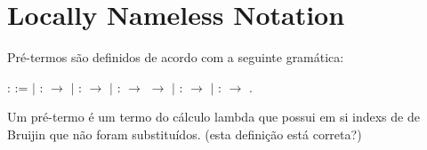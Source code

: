 
\begin{coqdoccode}
\coqdocemptyline
\end{coqdoccode}
\section{Locally Nameless Notation}



 Pré-termos são definidos de acordo com a seguinte gramática: \begin{coqdoccode}
\coqdocemptyline
\coqdocnoindent
{}  :  :=\coqdoceol
\coqdocindent{1.00em}
\ensuremath{|}  :  \ensuremath{\rightarrow} \coqdoceol
\coqdocindent{1.00em}
\ensuremath{|}  :  \ensuremath{\rightarrow} \coqdoceol
\coqdocindent{1.00em}
\ensuremath{|}   :  \ensuremath{\rightarrow}  \ensuremath{\rightarrow} \coqdoceol
\coqdocindent{1.00em}
\ensuremath{|}   :  \ensuremath{\rightarrow} \coqdoceol
\coqdocindent{1.00em}
\ensuremath{|}   :  \ensuremath{\rightarrow} .\coqdoceol
\coqdocemptyline
\end{coqdoccode}
Um pré-termo é um termo do cálculo lambda que possui em si indexs de de Bruijin que não foram
substituídos. (esta definição está correta?)\begin{coqdoccode}
\coqdocemptyline
\coqdocemptyline
\end{coqdoccode}
